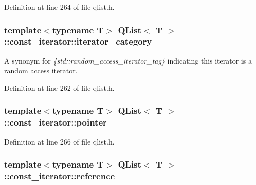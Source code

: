 Definition at line 264 of file qlist.\+h.

\subsubsection[{\texorpdfstring{iterator\+\_\+category}{iterator_category}}]{\setlength{\rightskip}{0pt plus 5cm}template$<$typename T$>$ {\bf Q\+List}$<$ T $>$\+::{\bf const\+\_\+iterator\+::iterator\+\_\+category}}\hypertarget{class_q_list_1_1const__iterator_a3f60c0d419aa760c74baf9259c5309a7}{}\label{class_q_list_1_1const__iterator_a3f60c0d419aa760c74baf9259c5309a7}
A synonym for {\itshape \{std\+::random\+\_\+access\+\_\+iterator\+\_\+tag\}} indicating this iterator is a random access iterator. 

Definition at line 262 of file qlist.\+h.

\subsubsection[{\texorpdfstring{pointer}{pointer}}]{\setlength{\rightskip}{0pt plus 5cm}template$<$typename T$>$ {\bf Q\+List}$<$ T $>$\+::{\bf const\+\_\+iterator\+::pointer}}\hypertarget{class_q_list_1_1const__iterator_a533c6c850de0bc2484878d5c4bcb0513}{}\label{class_q_list_1_1const__iterator_a533c6c850de0bc2484878d5c4bcb0513}


Definition at line 266 of file qlist.\+h.

\subsubsection[{\texorpdfstring{reference}{reference}}]{\setlength{\rightskip}{0pt plus 5cm}template$<$typename T$>$ {\bf Q\+List}$<$ T $>$\+::{\bf const\+\_\+iterator\+::reference}}\hypertarget{class_q_list_1_1const__iterator_a52b9df9ae3c6d68e3b34cc0430e782e6}{}\label{class_q_list_1_1const__iterator_a52b9df9ae3c6d68e3b34cc0430e782e6}


